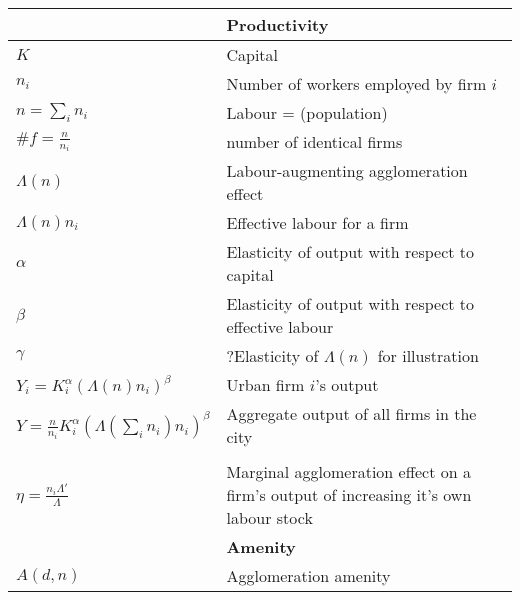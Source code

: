 \begin{longtable}{lp{10cm}}
\hline
		&\textbf{Productivity}\\ \hline
$K$  &  Capital\\
$n_i$  &  Number of workers employed by firm $i$\\
$n=\sum_i n_i$  &  Labour = (population)\\
$\#f=\frac{n}{n_i}$&number of identical firms\\ %
$\Lambda(n)$  &  Labour-augmenting agglomeration effect \\
$\Lambda(n)n_i$  &  Effective labour for a firm\\
$\alpha$  &  Elasticity of output with respect to capital\\
$\beta$  &  Elasticity of output with respect to effective labour\\
$\gamma$  &  ?Elasticity of $\Lambda(n)$ for illustration\\

$Y_i=K_i^{\alpha }(\Lambda(n)n_i)^{\beta }$  &  Urban firm $i$'s output\\
$Y=\frac{n}{n_i}K_i^{\alpha }(\Lambda(\sum_i n_i)n_i)^{\beta }$  &  Aggregate output of all firms in the city\\
\\

$\eta=\frac{n_i\Lambda'}{\Lambda}$  &   Marginal agglomeration effect on a firm's output of increasing it's own labour stock\\
\hline
	&\textbf{Amenity}\\ \hline
$A(d, n)$   &  Agglomeration amenity\\
\hline


\end{longtable}
